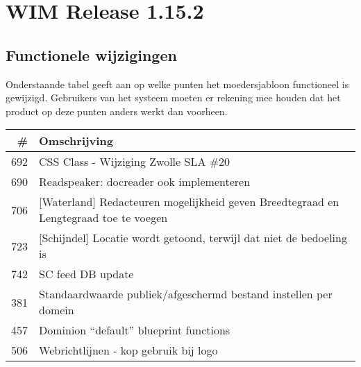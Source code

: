 

\newcommand{\release}{1.15.2}
\newcommand{\projectname}{WIM Release \release}

\newcommand{\customer}{Dimpact} %
\newcommand{\customershort}{Dimpact} %

\newcommand{\customerdomain}{dimpact.nl}
\newcommand{\authors}{R. Meijer}
\newcommand{\lastversion}{1.0}
\newcommand{\lastupdate}{18-05-2016}






\tableofcontents
\pagebreak



\section{\projectname} %
\label{sec:release}


\subsection{Functionele wijzigingen} %
\label{sub:functionele_wijzigingen}

Onderstaande tabel geeft aan op welke punten het moedersjabloon functioneel is gewijzigd. Gebruikers van het systeem moeten er rekening mee houden dat het product op deze punten anders werkt dan voorheen.

\begin{tabular}{ r | p{15cm} } \hline
  \textbf{\#} & \textbf{Omschrijving} \\ \hline
  692 & CSS Class - Wijziging Zwolle SLA \#20 \\ \hline
  690 & Readspeaker: docreader ook implementeren \\ \hline
  706 & [Waterland] Redacteuren mogelijkheid geven Breedtegraad en Lengtegraad toe te voegen \\ \hline
  723 & [Schijndel] Locatie wordt getoond, terwijl dat niet de bedoeling is \\ \hline
  742 & SC feed DB update \\ \hline
  381 & Standaardwaarde publiek/afgeschermd bestand instellen per domein \\ \hline
  457 & Dominion ``default'' blueprint functions \\ \hline
  506 & Webrichtlijnen - kop gebruik bij logo \\ \hline
\end{tabular}

